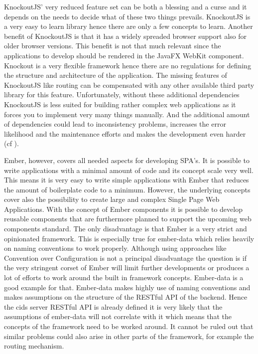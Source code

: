 KnockoutJS' very reduced feature set can be both a blessing and a curse and it depends on the needs to decide what of these two things prevails.
KnockoutJS is a very easy to learn library hence there are only a few concepts to learn.
Another benefit of KnockoutJS is that it has a widely spreaded browser support also for older browser versions.
This benefit is not that much relevant since the applications to develop should be rendered in the JavaFX WebKit component.
Knockout is a very flexible framework hence there are  no regulations for defining the structure and architecture of the application.
The missing features of KnockoutJS like routing can be compensated with any other available third party library for this feature.
Unfortunately, without these additional dependencies KnockoutJS is less suited for building rather complex web applications as it forces you to implement very many things manually.
And the additional amount of dependencies could lead to inconsistency problems, increases the error likelihood and the maintenance efforts and makes the development even harder (cf \autocite{heise_knockout}).  

Ember, however, covers all needed aspects for developing SPA's.
It is possible to write applications with a minimal amount of code and its concept scale very well.
This means it is very easy to write simple applications with Ember that reduces the amount of boilerplate code to a minimum.
However, the underlying concepts cover also the possibility to create large and complex Single Page Web Applications. With the concept of Ember components  it is possible to develop reusable components that are furthermore planned to support the upcoming web components standard. 
The only disadvantage is that Ember is a very strict and opinionated framework.
This is especially true for ember-data which relies heavily on naming conventions to work properly.
Although using approaches like Convention over Configuration is not a principal disadvantage the question is if the very stringent corset of Ember will limit further developments or produces a lot of efforts to work around the built in framework concepts.
Ember-data is a good example for that.
Ember-data makes highly use of naming conventions and makes assumptions on the structure of the RESTful API of the backend. 
Hence the cids server RESTful API is already defined it is very likely that the assumptions of ember-data will not correlate with it which means that the concepts of the framework need to be worked around.
It cannot be ruled out that similar problems could also arise in other parts of the framework, for example the routing mechanism. 

